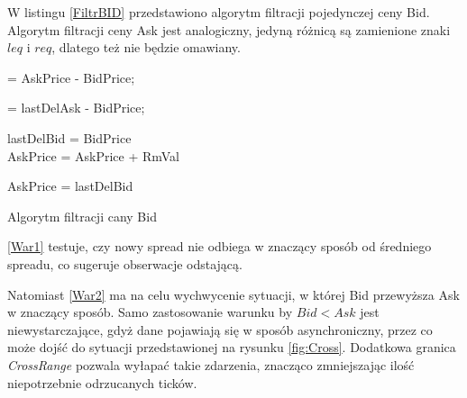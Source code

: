 \documentclass[a4paper,12pt,openany, DIV=calc, headsepline]{scrbook}
\begin{document}
W listingu \ref{FiltrBID} przedstawiono algorytm filtracji pojedynczej ceny Bid. Algorytm filtracji ceny Ask jest analogiczny, jedyną różnicą są zamienione znaki $leq$ i $req$, dlatego też nie będzie omawiany.



\IncMargin{5em}
\begin{algorithm}

\Spt = AskPrice - BidPrice; 



\label{War1}
{
\label{Zab1}	\Spt = lastDelAsk - BidPrice; 

	{
		lastDelBid = BidPrice\\
\label{Zab2} AskPrice = AskPrice + RmVal\\


	
	}
	
\label{Uwaga1}	AskPrice = lastDelBid
	
}

\caption{Algorytm filtracji cany Bid\label{FiltrBID}}
\end{algorithm}
\DecMargin{5em}

\ref{War1} testuje, czy nowy spread nie odbiega w znaczący sposób od średniego spreadu, co sugeruje obserwacje odstającą. 

Natomiast \ref{War2} ma na celu wychwycenie sytuacji, w której Bid przewyższa Ask w znaczący sposób. Samo zastosowanie warunku by $Bid < Ask$ jest niewystarczające, gdyż dane pojawiają się w sposób asynchroniczny, przez co może dojść do sytuacji przedstawionej na rysunku \ref{fig:Cross}. Dodatkowa granica \emph{CrossRange} pozwala wyłapać takie zdarzenia, znacząco zmniejszając ilość niepotrzebnie odrzucanych ticków.
\end{document}
